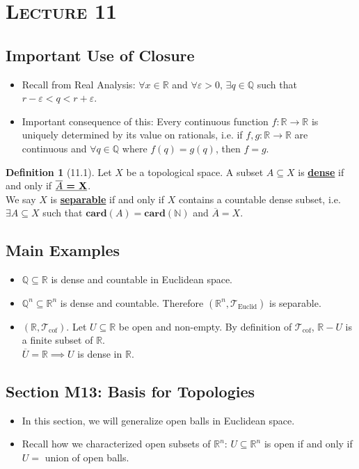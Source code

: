 \documentclass{article}
\newcommand{\R}{\ensuremath{\mathbb{R}}}
\newcommand{\N}{\ensuremath{\mathbb{N}}}
\newcommand{\Q}{\ensuremath{\mathbb{Q}}}
\newcommand{\card}[1]{\ensuremath{\mathbf{card} (#1)}}
\newcommand{\func}[1]{\ensuremath{#1:\R \to \R}}
\newcommand{\Iff}{if and only if}
\newcommand{\closure}[1]{\ensuremath{\overline{#1}}}
\newcommand{\define}[1]{\textbf{\underline{#1}}}
\newcommand{\ts}{topological space}
\newcommand{\tp}{\ensuremath{\mathcal{T}}}
\newcommand{\Ts}[2]{\ensuremath{(#1,#2)}}
\newcommand{\tpcof}{\ensuremath{\tp_\text{cof}}}
\renewcommand{\Subset}{\subseteq}
\theoremstyle{definition}
\newtheorem*{defn}{Definition}
\theoremstyle{remark}
\begin{document}
    \section*{\textbf{\textsc{Lecture 11}}}
        \subsection*{Important Use of Closure}
            \begin{itemize}
                \item Recall from Real Analysis: $\forall x \in \R$ and $\forall \varepsilon > 0, \, \exists q \in \Q$ such that $r-\varepsilon < q < r+\varepsilon$.
                \item Important consequence of this: Every continuous function $\func{f}$ is uniquely determined by its value on rationals, i.e. if $\func{f,g}$ are continuous and $\forall q \in \Q$ where $f(q)=g(q)$, then $f=g$.
            \end{itemize}
            \begin{defn}[11.1]
                Let $X$ be a \ts. A subset $A \Subset X$ is \define{dense} \Iff{} $\define{\closure{A} = X}$.\\
                We say $X$ is \define{separable} \Iff{} $X$ contains a countable dense subset, i.e. $\exists A \Subset X$ such that $\card{A} = \card{\N}$ and $\closure{A} = X$.
            \end{defn}
        
        \subsection*{Main Examples}
            \begin{itemize}
                \item $\Q \Subset \R$ is dense and countable in Euclidean space.
                \item $\Q^n \Subset \R^n$ is dense and countable. Therefore $\Ts{\R^n}{\tp_{\text{Euclid}}}$ is separable.
                \item $\Ts{\R}{\tpcof}$. Let $U \Subset \R$ be open and non-empty. By definition of $\tpcof$, $\R-U$ is a finite subset of $\R$.\\
                $\closure{U} = \R \implies U$ is dense in $\R$.
            \end{itemize}
            
        \subsection*{Section M13: Basis for Topologies}
            \begin{itemize}
                \item In this section, we will generalize open balls in Euclidean space.
                \item Recall how we characterized open subsets of $\R^n$: $U \Subset \R^n$ is open \Iff{} $U = $ union of open balls.
            \end{itemize}
        
\end{document}
